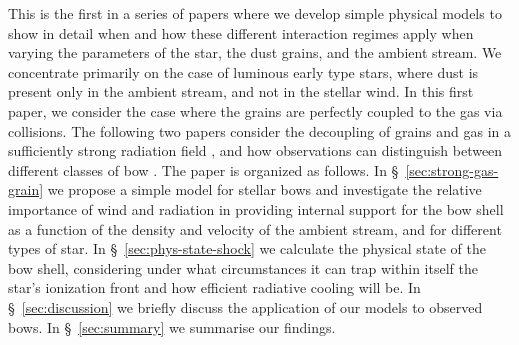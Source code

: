 

This is the first in a series of papers where we develop simple
physical models to show in detail when and how these different
interaction regimes apply when varying the parameters of the star, the
dust grains, and the ambient stream.  We concentrate primarily on the
case of luminous early type stars, where dust is present only in the
ambient stream, and not in the stellar wind.  In this first paper, we
consider the case where the grains are perfectly coupled to the gas
via collisions.  The following two papers consider the decoupling of
grains and gas in a sufficiently strong radiation field
\citep[Paper~II]{Henney:2019b}, and how observations can distinguish
between different classes of bow \citep[Paper~III]{Henney:2019c}.
%
The paper is organized as follows.
%
In \S~\ref{sec:strong-gas-grain} we propose a simple model for stellar
bows and investigate the relative importance of wind and radiation in
providing internal support for the bow shell as a function of the
density and velocity of the ambient stream, and for different types of
star.  In \S~\ref{sec:phys-state-shock} we calculate the physical
state of the bow shell, considering under what circumstances it can
trap within itself the star's ionization front and how efficient
radiative cooling will be.
%
In \S~\ref{sec:discussion} we briefly discuss the application
of our models to observed bows.
%
In \S~\ref{sec:summary} we summarise our findings. 
%








